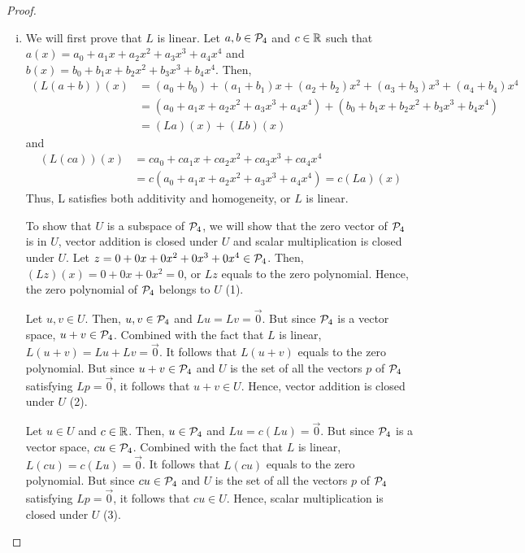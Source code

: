 \begin{proof}
	\renewcommand{\qedsymbol}{$\blacksquare$}
	\begin{enumerate}[(i)]
		\item We will first prove that $L$ is linear. Let $a,b\in\P_4$ and $c\in\R$ such that $a(x)=a_0+a_1x+a_2x^2+a_3x^3+a_4x^4$ and $b(x)=b_0+b_1x+b_2x^2+b_3x^3+b_4x^4$. Then,
		      \begin{equation*}
			      \begin{aligned}
				      (L(a+b))(x)
				       & = (a_0+b_0)+(a_1+b_1)x+(a_2+b_2)x^2+(a_3+b_3)x^3+(a_4+b_4)x^4     \\
				       & = (a_0+a_1x+a_2x^2+a_3x^3+a_4x^4)+(b_0+b_1x+b_2x^2+b_3x^3+b_4x^4) \\
				       & =(La)(x)+(Lb)(x)
			      \end{aligned}
		      \end{equation*}
		      and
		      \begin{equation*}
			      \begin{aligned}
				      (L(ca))(x)
				       & = ca_0+ca_1x+ca_2x^2+ca_3x^3+ca_4x^4        \\
				       & = c(a_0+a_1x+a_2x^2+a_3x^3+a_4x^4)=c(La)(x)
			      \end{aligned}
		      \end{equation*}
		      Thus, L satisfies both additivity and homogeneity, or $L$ is linear.

		      To show that $U$ is a subspace of $\P_4$, we will show that the zero vector of $\P_4$ is in $U$, vector addition is closed under $U$ and scalar multiplication is closed under $U$.
		      Let $z=0+0x+0x^2+0x^3+0x^4\in\P_4$. Then, $(Lz)(x)=0+0x+0x^2=0$, or $Lz$ equals to the zero polynomial. Hence, the zero polynomial of $\P_4$ belongs to $U$ (1).

		      Let $u,v\in U$.
			  Then, $u,v\in\P_4$ and $Lu=Lv=\vec{0}$.
			  But since $\P_4$ is a vector space, $u+v\in\P_4$.
			  Combined with the fact that $L$ is linear, $L(u+v)=Lu+Lv=\vec{0}$. 
			  It follows that $L(u+v)$ equals to the zero polynomial. 
			  But since $u+v\in\P_4$ and $U$ is the set of all the vectors $p$ of $\P_4$ satisfying $Lp=\vec{0}$, it follows that $u+v\in U$.
			  Hence, vector addition is closed under $U$ (2).

			  Let $u\in U$ and $c\in\R$.
			  Then, $u\in\P_4$ and $Lu=c(Lu)=\vec{0}$.
			  But since $\P_4$ is a vector space, $cu\in\P_4$.
			  Combined with the fact that $L$ is linear, $L(cu)=c(Lu)=\vec{0}$.
			  It follows that $L(cu)$ equals to the zero polynomial.
			  But since $cu\in\P_4$ and $U$ is the set of all the vectors $p$ of $\P_4$ satisfying $Lp=\vec{0}$, it follows that $cu\in U$.
			  Hence, scalar multiplication is closed under $U$ (3).
			  

\end{enumerate}
\end{proof}

